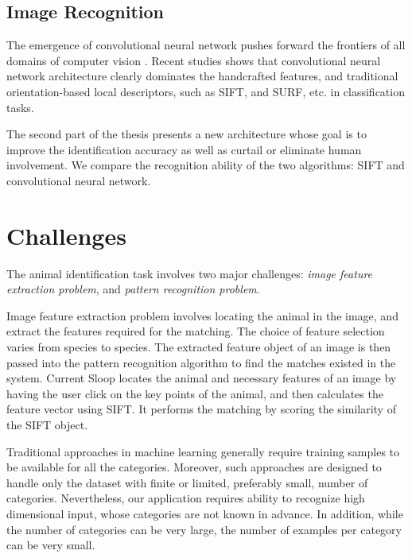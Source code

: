 \subsection{Image Recognition} %
\label{sub:image_recognition}
The emergence of convolutional neural network pushes forward the frontiers of all domains of computer vision \cite{lecun95}. Recent studies shows that convolutional neural network architecture clearly dominates the handcrafted features, and traditional orientation-based local descriptors, such as SIFT\cite{lowe04}, and SURF\cite{surf08}, etc. in classification tasks\cite{fisher14,kriz12,prelu15,ILSVRC15}.

The second part of the thesis presents a new architecture whose goal is to improve the identification accuracy as well as curtail or eliminate human involvement. We compare the recognition ability of the two algorithms: SIFT and convolutional neural network. 

\section{Challenges}

The animal identification task involves two major challenges: \emph{image feature extraction problem}, and \emph{pattern recognition problem}. 

Image feature extraction problem involves locating the animal in the image, and extract the features required for the matching. The choice of feature selection varies from species to species. The extracted feature object of an image is then passed into the pattern recognition algorithm to find the matches existed in the system. Current Sloop locates the animal and necessary features of an image by having the user click on the key points of the animal, and then calculates the feature vector using SIFT. It performs the matching by scoring the similarity of the SIFT object. 

Traditional approaches in machine learning generally require training samples to be available for all the categories. Moreover, such approaches are designed to handle only the dataset with finite or limited, preferably small, number of categories. Nevertheless, our application requires ability to recognize high dimensional input, whose categories are not known in advance. In addition, while the number of categories can be very large, the number of examples per category can be very small.
